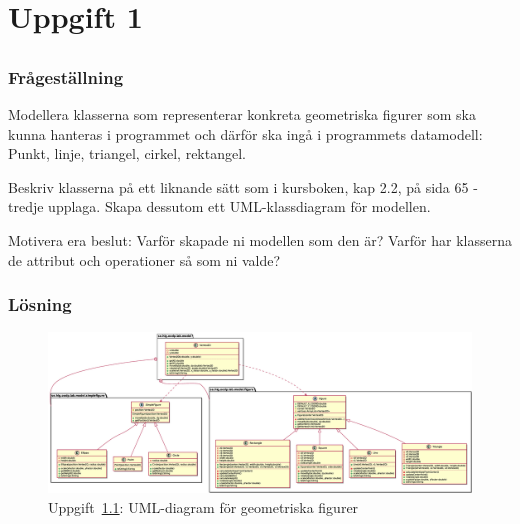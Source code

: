 %
%
%

\section{Uppgift 1}\label{sec:uppg01}

\subsection{}\label{sec:uppg1a}
\subsubsection*{Frågeställning}
Modellera klasserna som representerar konkreta geometriska figurer som ska
kunna hanteras i programmet och därför ska ingå i programmets datamodell:
Punkt, linje, triangel, cirkel, rektangel. 
\par Beskriv klasserna på ett liknande sätt som i kursboken, kap 2.2, på sida 65 -
tredje upplaga.  Skapa dessutom ett UML-klassdiagram för modellen.
\par Motivera era beslut: Varför skapade ni modellen som den är? Varför har
klasserna de attribut och operationer så som ni valde?

\subsubsection*{Lösning}
\begin{figure}[htbp]
\centering
\includegraphics[width=\linewidth]{diagram/uppgift2-icons.eps}
\caption{Uppgift~\ref{sec:uppg1a}: UML-diagram för geometriska figurer}
\label{fig:uppg1a}
\end{figure}


